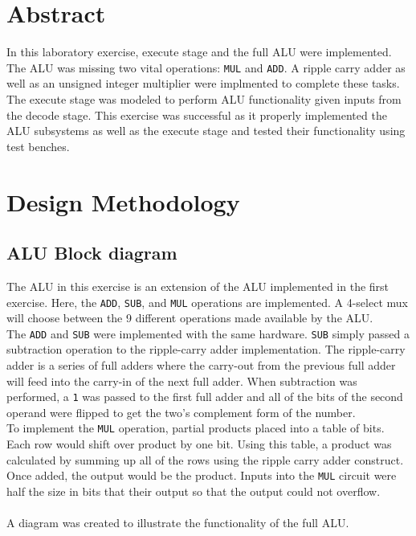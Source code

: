 \documentclass[CMPE]{../KGCOEReport}
\def\code#1{\texttt{#1}}
\begin{document}
    \maketitle
    \section*{Abstract}

    In this laboratory exercise, execute stage and the full ALU were implemented.
    The ALU was missing two vital operations: \code{MUL} and \code{ADD}. A ripple
    carry adder as well as an unsigned integer multiplier were implmented to 
    complete these tasks. The execute stage was modeled to perform ALU 
    functionality given inputs from the decode stage. This exercise was
    successful as it properly implemented the ALU subsystems as well as the
    execute stage and tested their functionality using test benches.

    \section*{Design Methodology}

    \subsection*{ALU Block diagram}
    
    The ALU in this exercise is an extension of the ALU implemented in the
    first exercise. Here, the \code{ADD}, \code{SUB}, and \code{MUL} operations
    are implemented. A 4-select mux will choose between the 9 different
    operations made available by the ALU.
    \\
    The \code{ADD} and \code{SUB} were implemented with the same hardware.
    \code{SUB} simply passed a subtraction operation to the ripple-carry
    adder implementation. The ripple-carry adder is a series of full adders
    where the carry-out from the previous full adder will feed into the
    carry-in of the next full adder. When subtraction was performed, a \code{1}
    was passed to the first full adder and all of the bits of the second operand
    were flipped to get the two's complement form of the number.
    \\
    To implement the \code{MUL} operation, partial products placed into a
    table of bits. Each row would shift over product by one bit.
    Using this table, a product was calculated by summing up all of the rows
    using the ripple carry adder construct. Once added, the output would be
    the product. Inputs into the \code{MUL} circuit were half the size in bits
    that their output so that the output could not overflow.
    \\\\
    A diagram was created to illustrate the functionality of the full ALU.
    
\end{document}
